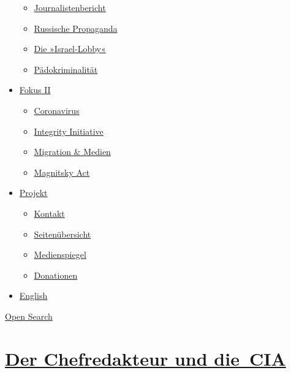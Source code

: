 \begin{itemize}
  \begin{itemize}
  \tightlist
  \item
    \href{https://swprs.org/bericht-eines-journalisten/}{Journalistenbericht}
  \item
    \href{https://swprs.org/russische-propaganda/}{Russische Propaganda}
  \item
    \href{https://swprs.org/die-israel-lobby-fakten-und-mythen/}{Die
    »Israel-Lobby«}
  \item
    \href{https://swprs.org/geopolitik-und-paedokriminalitaet/}{Pädokriminalität}
  \end{itemize}
\item
  \href{https://swprs.org/migration-und-medien/}{Fokus II}

  \begin{itemize}
  \tightlist
  \item
    \href{https://swprs.org/covid-19-hinweis-ii/}{Coronavirus}
  \item
    \href{https://swprs.org/die-integrity-initiative/}{Integrity
    Initiative}
  \item
    \href{https://swprs.org/migration-und-medien/}{Migration \& Medien}
  \item
    \href{https://swprs.org/der-fall-magnitsky/}{Magnitsky Act}
  \end{itemize}
\item
  \href{https://swprs.org/kontakt/}{Projekt}

  \begin{itemize}
  \tightlist
  \item
    \href{https://swprs.org/kontakt/}{Kontakt}
  \item
    \href{https://swprs.org/uebersicht/}{Seitenübersicht}
  \item
    \href{https://swprs.org/medienspiegel/}{Medienspiegel}
  \item
    \href{https://swprs.org/donationen/}{Donationen}
  \end{itemize}
\item
  \href{https://swprs.org/contact/}{English}
\end{itemize}

\protect\hyperlink{}{Open Search}

\hypertarget{der-chefredakteur-und-die-cia}{%
\section{\texorpdfstring{\href{https://swprs.org/2017/03/01/chefredakteur-cia/}{Der
Chefredakteur und
die~CIA}}{Der Chefredakteur und die~CIA}}\label{der-chefredakteur-und-die-cia}}

